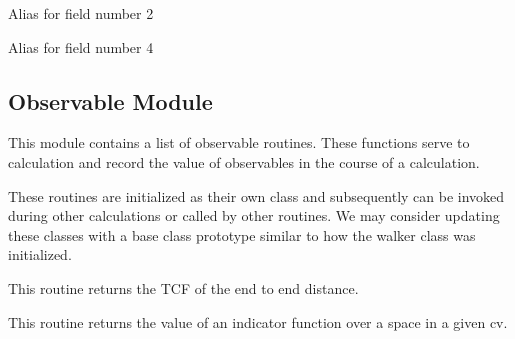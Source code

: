 \documentclass[letterpaper,10pt,english]{sphinxmanual}
\begin{document}
\begin{fulllineitems}
\begin{fulllineitems}
\end{fulllineitems}


\begin{fulllineitems}
\label{applications/applications.doc:entryPoints.entry_point.ref_q}
Alias for field number 2

\end{fulllineitems}


\begin{fulllineitems}
\label{applications/applications.doc:entryPoints.entry_point.time}
Alias for field number 4

\end{fulllineitems}


\end{fulllineitems}



\subsection{Observable Module}
\label{applications/applications.doc:module-observables}\label{applications/applications.doc:observable-module}
This module contains a list of observable routines. These functions serve to calculation and record the value of observables in the course of a calculation.

These routines are initialized as their own class and subsequently can be invoked during other calculations or called by other routines. We may consider updating these classes with a base class prototype similar to how the walker class was initialized.

\begin{fulllineitems}
\label{applications/applications.doc:observables.P1}
This routine returns the TCF of the end to end distance.

\end{fulllineitems}


\begin{fulllineitems}
\label{applications/applications.doc:observables.cv_indicator_correlation}
This routine returns the value of an indicator function over a space in a given cv.

\end{fulllineitems}
\end{document}
